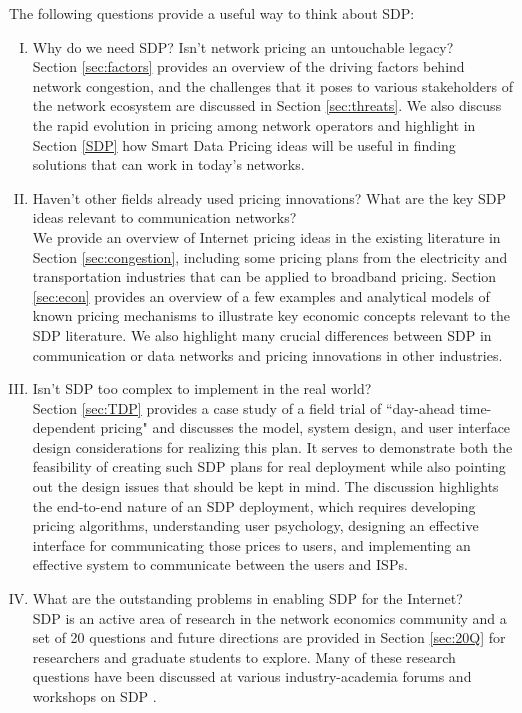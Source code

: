 The following questions provide a useful way to think about SDP: 
\begin{enumerate}[(I)]
\item Why do we need SDP? Isn't network pricing an untouchable legacy?\\
Section \ref{sec:factors} provides an overview of the driving factors behind network congestion, and the challenges that it poses to various stakeholders of the network ecosystem are discussed in Section \ref{sec:threats}. We also discuss the rapid evolution in pricing among network operators and highlight in Section \ref{SDP} how Smart Data Pricing ideas will be useful in finding solutions that can work in today's networks.
\item Haven't other fields already used pricing innovations? What are the key SDP ideas relevant to communication networks?\\
We provide an overview of Internet pricing ideas in the existing literature in Section \ref{sec:congestion}, including some pricing plans from the electricity and transportation industries that can be applied to broadband pricing. Section \ref{sec:econ} provides an overview of a few examples and analytical models of known pricing mechanisms to illustrate key economic concepts relevant to the SDP literature. We also highlight many crucial differences between SDP in communication or data networks and pricing innovations in other industries.
\item Isn't SDP too complex to implement in the real world?\\
Section \ref{sec:TDP} provides a case study of a field trial of ``day-ahead time-dependent pricing" and discusses the model, system design, and user interface design considerations for realizing this plan. It serves to demonstrate both the feasibility of creating such SDP plans for real deployment while also pointing out the design issues that should be kept in mind. The discussion highlights the end-to-end nature of an SDP deployment, which requires developing pricing algorithms, understanding user psychology, designing an effective interface for communicating those prices to users, and implementing an effective system to communicate between the users and ISPs.
\item What are the outstanding problems in enabling SDP for the Internet?\\
SDP is an active area of research in the network economics community and a set of 20 questions and future directions are provided in Section \ref{sec:20Q} for researchers and graduate students to explore. Many of these research questions have been discussed at various industry-academia forums and workshops on SDP \cite{SDPForum,SDP2013}.  
\end{enumerate}


